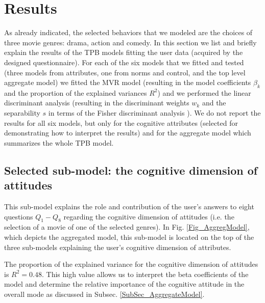 \section{Results}\label{Sec_Results}

As already indicated, the selected behaviors that we modeled are the choices of three movie genres: drama, action and comedy. In this section we list and briefly explain the results of the TPB models fitting the user data (acquired by the designed questionnaire).  For each of the six models that we fitted and tested (three models from attributes, one from norms and control, and the top level aggregate model) we fitted the MVR model (resulting in the model coefficients $\beta_k$ and the proportion of the explained variances $R^2$) and we performed the linear discriminant analysis (resulting in the discriminant weights $w_k$ and the separability $s$ in terms of the Fisher discriminant analysis \cite{RencherChristensen201207}). We do not report the results for all six models, but only for the cognitive attributes (selected for demonstrating how to interpret the results) and for the aggregate model which summarizes the whole TPB model. 


\subsection{Selected sub-model: the cognitive dimension of attitudes}\label{SubSec_CogAttr}

This sub-model explains the role and contribution of the user's answers to eight questions $Q_1 - Q_8$ regarding the cognitive dimension of attitudes (i.e. the selection of a movie of one of the selected genres). In Fig. \ref{Fig_AggregModel}, which depicts the aggregated model, this sub-model is located on the top of the three sub-models explaining the user's cognitive dimension of attributes.

The proportion of the explained variance for the cognitive dimension of attitudes is $R^2=0.48$. This high value allows us to interpret the beta coefficients of the model and determine the relative importance of the cognitive attitude in the overall mode as discussed in Subsec. \ref{SubSec_AggregateModel}.

